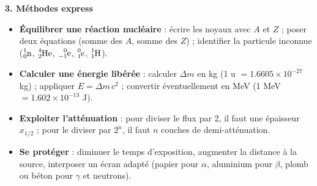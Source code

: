 \documentclass[11pt]{article}
\newcommand{\cle}[1]{{\popxbold\color{popdark}#1}}
\begin{document}
\begin{bilan}
\textbf{3. Méthodes express}
\begin{itemize}
\item \textbf{Équilibrer une réaction nucléaire} : écrire les noyaux avec $A$ et $Z$ ; poser deux équations (somme des $A$, somme des $Z$) ; identifier la particule inconnue ($\ce{^{1}_{0}n}$, $\ce{^{4}_{2}He}$, $\ce{^{0}_{-1}e}$, $\ce{^{0}_{1}e}$, $\ce{^{1}_{1}H}$).
\item \textbf{Calculer une énergie libérée} : calculer $\Delta m$ en kg (1 u $= \num{1,6605}\times 10^{-27}$ kg) ; appliquer $E = \Delta m\, c^{2}$ ; convertir éventuellement en MeV (1 MeV $= \num{1,602}\times 10^{-13}$ J).
\item \textbf{Exploiter l'atténuation} : pour diviser le flux par 2, il faut une épaisseur $x_{1/2}$ ; pour le diviser par $2^{n}$, il faut $n$ couches de demi-atténuation.
\item \textbf{Se protéger} : diminuer le \cle{temps} d'exposition, augmenter la \cle{distance} à la source, interposer un \cle{écran} adapté (papier pour $\alpha$, aluminium pour $\beta$, plomb ou béton pour $\gamma$ et neutrons).
\end{itemize}
\end{bilan}
\end{document}

